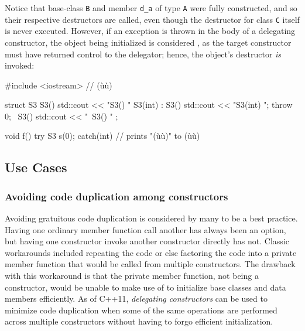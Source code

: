 \noindent Notice that base-class \lstinline!B! and member \lstinline!d_a! of type
\lstinline!A! were fully constructed, and so their respective destructors
are called, even though the destructor for class \lstinline!C! itself is never \mbox{executed}. 
However, if an exception is thrown in the body of a delegating
constructor, the object being initialized is considered , as the target constructor must have returned control to
the delegator; hence, the object's destructor \emph{is} invoked:

\begin{emcppslisting}[language=C++]
#include <iostream>  // (ù{}ù)

struct S3
{
    S3()           { std::cout << "S3() "              }
    S3(int) : S3() { std::cout << "S3(int) "; throw 0; }
    ~S3()          { std::cout << "~S3() "             }
};

void f() try { S3 s(0); } catch(int) { }
    // prints "(ù{}ù)" to (ù{}ù)
\end{emcppslisting}
    

\subsection[Use Cases]{Use Cases}\label{ctordelegating-use-cases}

\subsubsection[Avoiding code duplication among constructors]{Avoiding code duplication among constructors}\label{avoiding-code-duplication-among-constructors}

Avoiding gratuitous code duplication is considered by many to be a best
practice. Having one ordinary member function call another has always
been an option, but having one constructor invoke another constructor
directly has not. Classic workarounds included repeating the code or
else factoring the code into a private member function that would be
called from multiple constructors. The drawback with this workaround is
that the private member function, not being a constructor, would be unable to
make use of  to initialize base classes and data members efficiently. As of C++11, \emph{delegating
constructors} can be used to minimize code duplication when some of
the same operations are performed across multiple constructors without
having to forgo efficient initialization.

